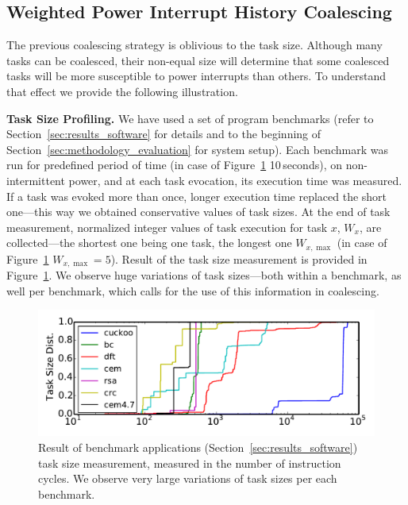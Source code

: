 \subsection{Weighted Power Interrupt History Coalescing}

The previous coalescing strategy is oblivious to the task size. Although many tasks can be coalesced, their non-equal size will determine that some coalesced tasks will be more susceptible to power interrupts than others. To understand that effect we provide the following illustration. 

\textbf{Task Size Profiling.} We have used a set of program benchmarks (refer to Section~\ref{sec:results_software} for details and to the beginning of Section~\ref{sec:methodology_evaluation} for system setup). Each benchmark was run for predefined period of time (in case of Figure~\ref{fig:task_profiling} 10\,seconds), on non-intermittent power, and at each task evocation, its execution time was measured. If a task was evoked more than once, longer execution time replaced the short one---this way we obtained conservative values of task sizes. At the end of task measurement, normalized integer values of task execution for task $x$, $W_x$, are collected---the shortest one being one task, the longest one $W_{x,\max}$ (in case of Figure~\ref{fig:task_profiling} $W_{x,\max}=5$). Result of the task size measurement is provided in Figure~\ref{fig:task_profiling}. We observe huge variations of task sizes---both within a benchmark, as well per benchmark, which calls for the use of this information in coalescing.

\begin{figure}
	\centering
	\includegraphics[width=\columnwidth]{figures/TskDist.pdf}%
	\caption{Result of benchmark applications (Section~\ref{sec:results_software}) task size measurement, measured in the number of instruction cycles. We observe very large variations of task sizes per each benchmark. }
	\label{fig:task_profiling}
\end{figure}

